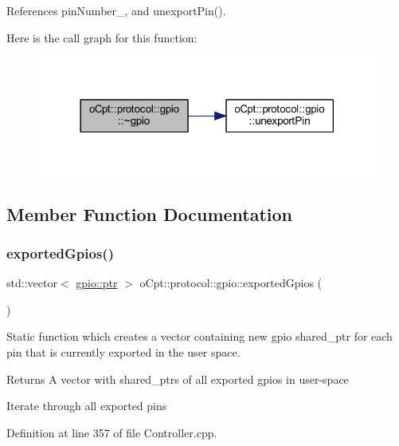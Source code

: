 References pin\+Number\+\_\+, and unexport\+Pin().

Here is the call graph for this function\+:\nopagebreak
\begin{figure}[H]
\begin{center}
\leavevmode
\includegraphics[width=318pt]{classo_cpt_1_1protocol_1_1gpio_a8ab3c04e4643a838f8d9ea26367e3545_cgraph}
\end{center}
\end{figure}


\subsection{Member Function Documentation}
\hypertarget{classo_cpt_1_1protocol_1_1gpio_a2beacd45b177eb627e66a3b252a4aaff}{}\label{classo_cpt_1_1protocol_1_1gpio_a2beacd45b177eb627e66a3b252a4aaff} 
\subsubsection{\texorpdfstring{exported\+Gpios()}{exportedGpios()}}
{\footnotesize\ttfamily std\+::vector$<$ \hyperlink{classo_cpt_1_1protocol_1_1gpio_acd4fb0fba7a813a8013511b374e73900}{gpio\+::ptr} $>$ o\+Cpt\+::protocol\+::gpio\+::exported\+Gpios (\begin{DoxyParamCaption}{ }\end{DoxyParamCaption})\hspace{0.3cm}{\ttfamily [static]}}

Static function which creates a vector containing new gpio shared\+\_\+ptr for each pin that is currently exported in the user space. \begin{DoxyReturn}{Returns}
A vector with shared\+\_\+ptr\textquotesingle{}s of all exported gpio\textquotesingle{}s in user-\/space 
\end{DoxyReturn}
Iterate through all exported pins 

Definition at line 357 of file Controller.\+cpp.



